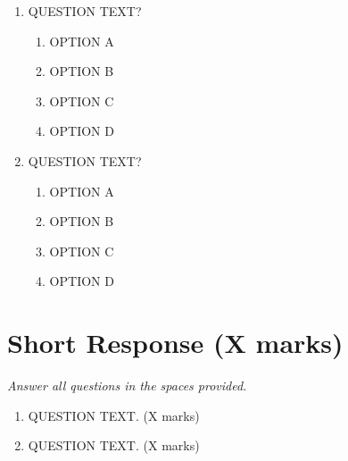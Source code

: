 \begin{enumerate}[leftmargin=*, label=\textbf{\arabic*.}]

    \item QUESTION TEXT?
    \begin{enumerate}[label=(\Alph*), topsep=2pt]
        \item OPTION A
        \item OPTION B
        \item OPTION C
        \item OPTION D
    \end{enumerate}

    \vspace{0.4em}

    \item QUESTION TEXT?
    \begin{enumerate}[label=(\Alph*), topsep=2pt]
        \item OPTION A
        \item OPTION B
        \item OPTION C
        \item OPTION D
    \end{enumerate}

\end{enumerate}

\newpage

\section*{Short Response (X marks)}

\textit{Answer all questions in the spaces provided.}

\vspace{0.5em}

\begin{enumerate}[leftmargin=*, label=\textbf{\arabic*.}]

    \item QUESTION TEXT. \hfill (X marks)\\[4cm]

    \vspace{0.5em}

    \item QUESTION TEXT. \hfill (X marks)\\[5cm]

\end{enumerate}

